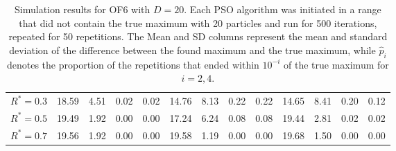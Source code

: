 \documentclass[12pt]{article}
\begin{document}
\begin{table}[ht]
{\begin{tabular}{r|rrrr|rrrr|rrrr}
  $R^* = 0.3$ & 18.59 & 4.51 & 0.02 & 0.02 & 14.76 & 8.13 & 0.22 & 0.22 & 14.65 & 8.41 & 0.20 & 0.12 \\ 
  $R^* = 0.5$ & 19.49 & 1.92 & 0.00 & 0.00 & 17.24 & 6.24 & 0.08 & 0.08 & 19.44 & 2.81 & 0.02 & 0.02 \\ 
  $R^* = 0.7$ & 19.56 & 1.92 & 0.00 & 0.00 & 19.58 & 1.19 & 0.00 & 0.00 & 19.68 & 1.50 & 0.00 & 0.00 \\ 
   \hline
\end{tabular}
}
\caption{Simulation results for OF6 with $D=20$. Each PSO algorithm was initiated in a range that did not contain the true maximum with 20 particles and run for 500 iterations, repeated for 50 repetitions. The Mean and SD columns represent the mean and standard deviation of the difference between the found maximum and the true maximum, while $\widehat{p}_i$ denotes the proportion of the repetitions that ended within $10^{-i}$ of the true maximum for $i=2,4$.}
\label{tab:psosim6}
\end{table}
\end{document}
